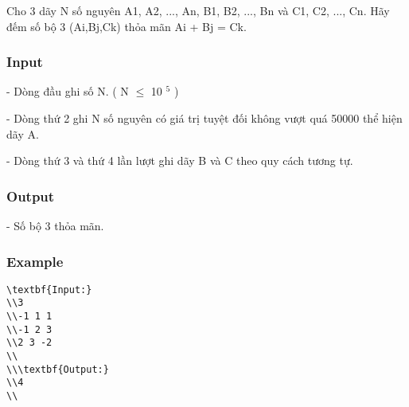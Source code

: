 



   Cho 3 dãy N số nguyên A1, A2, ..., An, B1, B2, ..., Bn và C1, C2, ..., Cn. Hãy đếm số bộ 3 (Ai,Bj,Ck) thỏa mãn Ai + Bj = Ck.  

\subsubsection{   Input  }

   - Dòng đầu ghi số N. ( N  $\le$  10   $^    5   $   )  

   - Dòng thứ 2 ghi N số nguyên có giá trị tuyệt đối không vượt quá 50000 thể hiện dãy A.  

   - Dòng thứ 3 và thứ 4 lần lượt ghi dãy B và C theo quy cách tương tự.  

\subsubsection{   Output  }

   - Số bộ 3 thỏa mãn.  

\subsubsection{   Example  }
\begin{verbatim}
\textbf{Input:}
\\3
\\-1 1 1
\\-1 2 3
\\2 3 -2
\\
\\\textbf{Output:}
\\4
\\\end{verbatim}
